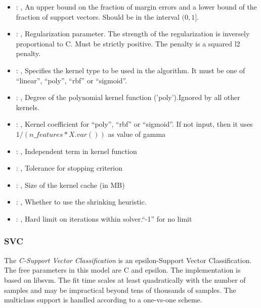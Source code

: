 \begin{itemize}
    \item {}: , 
      An upper bound on the fraction of margin errors and
      a lower bound of the fraction of support vectors. Should be in the interval $(0, 1]$.

    \item {}: , 
      Regularization parameter. The strength of the regularization is inversely
      proportional to C.                                                           Must be strictly
      positive. The penalty is a squared l2 penalty.

    \item {}: , 
      Specifies the kernel type to be used in the algorithm. It must be one of
      ``linear'', ``poly'', ``rbf'' or ``sigmoid''.

    \item {}: , 
      Degree of the polynomial kernel function ('poly').Ignored by all other kernels.

    \item {}: , 
      Kernel coefficient for ``poly'', ``rbf'' or ``sigmoid''. If not input, then it uses
      $1 / (n\_features * X.var())$ as value of gamma

    \item {}: , 
      Independent term in kernel function

    \item {}: , 
      Tolerance for stopping criterion

    \item {}: , 
      Size of the kernel cache (in MB)

    \item {}: , 
      Whether to use the shrinking heuristic.

    \item {}: , 
      Hard limit on iterations within solver.``-1'' for no limit
  \end{itemize}


\subsubsection{SVC}
  The  \textit{C-Support Vector Classification} is an epsilon-Support Vector
  Classification.                             The free parameters in this model are C and epsilon.
  The implementation is based on libsvm. The fit time scales at least
  quadratically with the number of samples and may be impractical                             beyond
  tens of thousands of samples. The multiclass support is handled according to a one-vs-one scheme.

